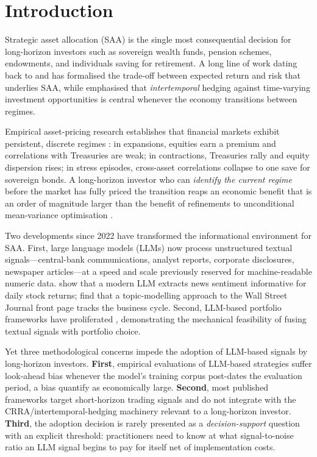\documentclass[review,12pt,authoryear]{elsarticle}
\begin{document}
\section{Introduction}
\label{sec:intro}

Strategic asset allocation (SAA) is the single most consequential decision for long-horizon
investors such as sovereign wealth funds, pension schemes, endowments, and individuals saving
for retirement. A long line of work dating back to \citet{Markowitz1952} and
\citet{Merton1969} has formalised the trade-off between expected return and risk that
underlies SAA, while \citet{Campbell2002} emphasised that \emph{intertemporal} hedging
against time-varying investment opportunities is central whenever the economy transitions
between regimes.

Empirical asset-pricing research establishes that financial markets exhibit persistent,
discrete regimes \citep{Hamilton1989,Ang2002RegimeSwitching,GuidolinTimmermann2007}: in
expansions, equities earn a premium and correlations with Treasuries are weak; in
contractions, Treasuries rally and equity dispersion rises; in stress episodes,
cross-asset correlations collapse to one save for sovereign bonds. A long-horizon investor
who can \emph{identify the current regime} before the market has fully priced the transition
reaps an economic benefit that is an order of magnitude larger than the benefit of
refinements to unconditional mean-variance optimisation \citep{GuidolinTimmermann2007,
Campbell2002}.

Two developments since 2022 have transformed the informational environment for SAA. First,
large language models (LLMs) now process unstructured textual signals---central-bank
communications, analyst reports, corporate disclosures, newspaper articles---at a speed and
scale previously reserved for machine-readable numeric data. \citet{LopezLira2023} show that
a modern LLM extracts news sentiment informative for daily stock returns; \citet{BybeeEtAl2024}
find that a topic-modelling approach to the Wall Street Journal front page tracks the business
cycle. Second, LLM-based portfolio frameworks have proliferated \citep{Chen2024LLMBL,
KimEtAl2025HARLF,Wang2025SectorAllocation,TangZhang2024LLMInvesting}, demonstrating the
mechanical feasibility of fusing textual signals with portfolio choice.

Yet three methodological concerns impede the adoption of LLM-based signals by long-horizon
investors. \textbf{First}, empirical evaluations of LLM-based strategies suffer look-ahead
bias whenever the model's training corpus post-dates the evaluation period, a bias
\citet{Glasserman2023LookAhead} quantify as economically large. \textbf{Second}, most
published frameworks target short-horizon trading signals and do not integrate with the
CRRA/intertemporal-hedging machinery relevant to a long-horizon investor. \textbf{Third},
the adoption decision is rarely presented as a \emph{decision-support} question with an
explicit threshold: practitioners need to know at what signal-to-noise ratio an LLM signal
begins to pay for itself net of implementation costs.
\end{document}
